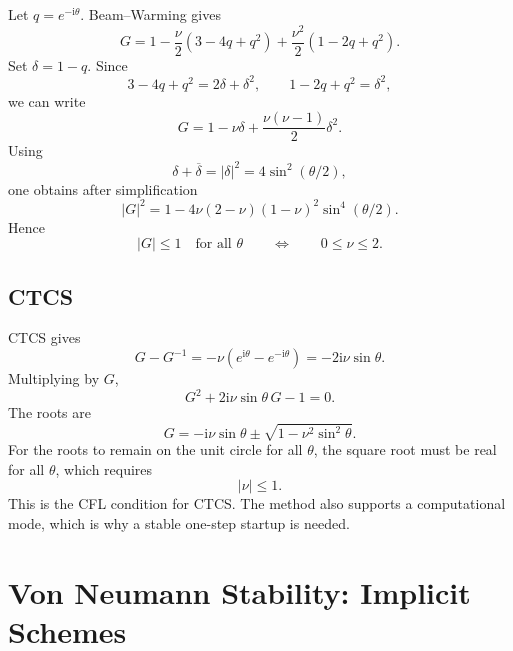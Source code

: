 \documentclass[11pt]{article}
\newcommand{\ii}{\mathrm{i}}
\begin{document}
Let $q=e^{-\ii\theta}$.  Beam--Warming gives
\begin{equation}
    G=
    1-\frac{\nu}{2}(3-4q+q^2)
    +\frac{\nu^2}{2}(1-2q+q^2).
\end{equation}
Set $\delta=1-q$.  Since
\begin{equation}
    3-4q+q^2=2\delta+\delta^2,\qquad
    1-2q+q^2=\delta^2,
\end{equation}
we can write
\begin{equation}
    G=1-\nu\delta+\frac{\nu(\nu-1)}{2}\delta^2.
\end{equation}
Using
\begin{equation}
    \delta+\overline{\delta}=|\delta|^2=4\sin^2(\theta/2),
\end{equation}
one obtains after simplification
\begin{equation}
    |G|^2
    =
    1-4\nu(2-\nu)(1-\nu)^2\sin^4(\theta/2).
\end{equation}
Hence
\begin{equation}
    |G|\le1 \quad\text{for all }\theta
    \qquad\Longleftrightarrow\qquad
    0\le\nu\le2.
\end{equation}

\subsection{CTCS}

CTCS gives
\begin{equation}
    G-G^{-1}=-\nu(e^{\ii\theta}-e^{-\ii\theta})
    =
    -2\ii\nu\sin\theta.
\end{equation}
Multiplying by $G$,
\begin{equation}
    G^2+2\ii\nu\sin\theta\,G-1=0.
\end{equation}
The roots are
\begin{equation}
    G=-\ii\nu\sin\theta
    \pm\sqrt{1-\nu^2\sin^2\theta}.
\end{equation}
For the roots to remain on the unit circle for all $\theta$, the square root must be real for all $\theta$, which requires
\begin{equation}
    |\nu|\le1.
\end{equation}
This is the CFL condition for CTCS.  The method also supports a computational mode, which is why a stable one-step startup is needed.

\section{Von Neumann Stability: Implicit Schemes}
\end{document}
